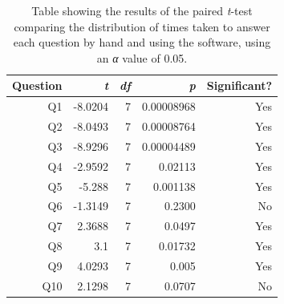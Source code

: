 \documentclass[12pt,twoside,notitlepage,xetex]{report}
\begin{document}
\begin{center}
\begin{table}[H]
\begin{center}
\begin{tabular}{|r|r|r|r|r|}
\hline
Question & \emph{t} & \emph{df} & \emph{p} & Significant?\\ \hline \hline
Q1 & -8.0204 & 7 & 0.00008968 & Yes\\ \hline
Q2 & -8.0493 & 7 & 0.00008764 & Yes\\ \hline
Q3 & -8.9296 & 7 & 0.00004489 & Yes\\ \hline
Q4 & -2.9592 & 7 & 0.02113 & Yes\\ \hline
Q5 & -5.288 & 7 &  0.001138 & Yes\\ \hline
Q6 & -1.3149 & 7 & 0.2300 & No\\ \hline
Q7 & 2.3688 & 7 &  0.0497 & Yes\\ \hline
Q8 & 3.1 & 7 & 0.01732 & Yes\\ \hline
Q9 & 4.0293 & 7 & 0.005 & Yes\\ \hline
Q10 & 2.1298 & 7 & 0.0707 & No\\
\hline
\end{tabular}
\end{center}
\caption{Table showing the results of the paired \emph{t}-test comparing the distribution of times taken to answer each question by hand and using the software, using an \emph{α} value of 0.05.}
\end{table}
\end{center}
\end{document}

